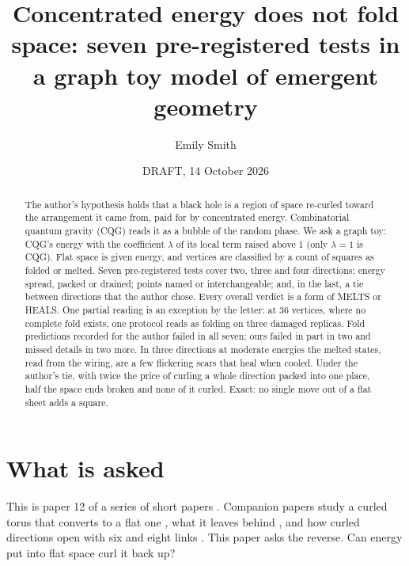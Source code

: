 \documentclass[aps,pre,10pt,twocolumn,superscriptaddress,nofootinbib]{revtex4-2}
\begin{document}
\title{Concentrated energy does not fold space: seven pre-registered tests in a graph toy model of emergent
geometry}

\author{Emily Smith}

\date{DRAFT, 14 October 2026}

\begin{abstract}
The author's hypothesis holds that a black hole is a region of space re-curled toward the arrangement it came from,
paid for by concentrated energy. Combinatorial quantum gravity (CQG) reads it as a bubble of the random phase. We ask
a graph toy: CQG's energy with the coefficient $\lambda$ of its local term raised above 1 (only $\lambda = 1$ is CQG).
Flat space is given energy, and vertices are classified by a count of squares as folded or melted. Seven
pre-registered tests cover two, three and four directions; energy spread, packed or drained; points named or
interchangeable; and, in the last, a tie between directions that the author chose. Every overall verdict is a form of
MELTS or HEALS. One partial reading is an exception by the letter: at 36 vertices, where no complete fold exists, one
protocol reads as folding on three damaged replicas. Fold predictions recorded for the author failed in all seven;
ours failed in part in two and missed details in two more. In three directions at moderate energies the melted
states, read from the wiring, are a few flickering scars that heal when cooled. Under the author's tie, with twice
the price of curling a whole direction packed into one place, half the space ends broken and none of it curled.
Exact: no single move out of a flat sheet adds a square.
\end{abstract}

\maketitle

\section{What is asked}\label{sec:asked}

This is paper 12 of a series of short papers \cite{repo}. Companion papers study a curled torus that converts to a
flat one \cite{paper1}, what it leaves behind \cite{paper2}, and how curled directions open with six and eight links
\cite{paper5}. This paper asks the reverse. Can energy put into flat space curl it back up?
\end{document}
